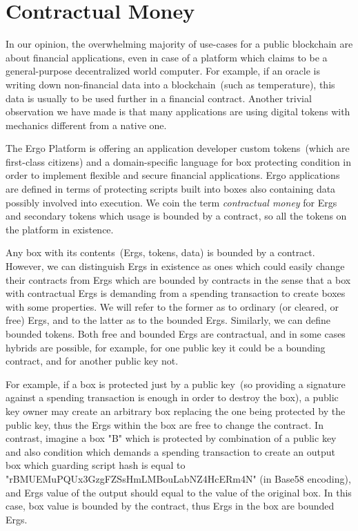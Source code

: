 

\section{Contractual Money}
    \label{sec:contractual}

 In our opinion, the overwhelming majority of use-cases for a public blockchain are about financial applications,
 even in case of a platform which claims to be a general-purpose decentralized world computer.
 For example, if an oracle is writing down
 non-financial data into a blockchain~(such as temperature), this data is usually to be used further in a financial
 contract. Another trivial observation we have made is that many applications are using digital tokens with mechanics
 different from a native one.

 The Ergo Platform is offering an application developer custom tokens~(which are first-class citizens) and a
 domain-specific language for box protecting
 condition in order to implement flexible and secure financial applications.
 Ergo applications are defined in terms of protecting scripts built into boxes also containing
 data possibly involved into execution. We coin the term {\em contractual money} for Ergs and secondary tokens which
 usage is bounded by a contract, so all the tokens on the platform in existence.

 Any box with its contents~(Ergs, tokens, data) is bounded by a contract.
 However, we can distinguish Ergs in existence as ones which could easily
 change their contracts from Ergs which are bounded by contracts in the sense that a box with contractual Ergs is
 demanding from a spending transaction to create boxes with some properties. We will refer to the former as to ordinary
 (or cleared, or free) Ergs, and to the latter as to the bounded Ergs. Similarly, we can define bounded tokens. Both
 free and bounded Ergs are contractual, and in some cases hybrids are possible, for example, for one public key it could
 be a bounding contract, and for another public key not.

 For example, if a box is protected just by a public key~(so providing a signature against a spending transaction is
 enough in order to destroy the box), a public key owner may create an arbitrary box replacing the one being protected
 by the public key, thus the Ergs within the box are free to change the contract. In contrast, imagine a box "B" which
 is protected by combination of a public key and also condition which demands a spending transaction to create an output
 box which guarding script hash is equal to "rBMUEMuPQUx3GzgFZSsHmLMBouLabNZ4HcERm4N" (in Base58 encoding), and Ergs
 value of the output should equal to the value of the original box. In this case, box value is bounded by the contract,
 thus Ergs in the box are bounded Ergs.

